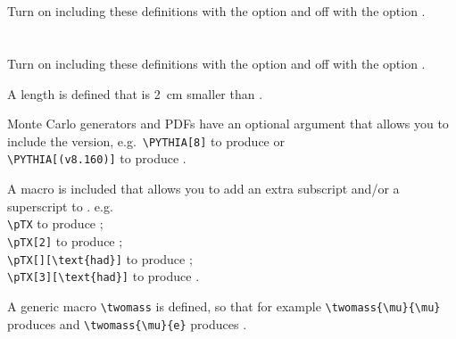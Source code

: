 \newpage
\section{}

Turn on including these definitions with the option  and off with the option .




\newpage
\section{}

Turn on including these definitions with the option  and off with the option .



\noindent A length  is defined that is \qty{2}{\cm} smaller than .

\noindent Monte Carlo generators and PDFs have an optional argument
that allows you to include the version, e.g.\
\verb|\PYTHIA[8]| to produce \PYTHIA[8] or\\
\verb|\PYTHIA[(v8.160)]| to produce \PYTHIA[(v8.160)].

\noindent A macro  is included that allows you to add an extra subscript and/or a superscript to \pT.
e.g.\\
\verb|\pTX| to produce \pTX;\\
\verb|\pTX[2]| to produce \pTX[2];\\
\verb|| to produce \pTX[][\text{had}];\\
\verb|| to produce \pTX[3][\text{had}].

\noindent A generic macro \verb|\twomass| is defined, so that for example
\verb|\twomass{\mu}{\mu}| produces \twomass{\mu}{\mu} and \verb|| produces \twomass{\mu}{e}.


